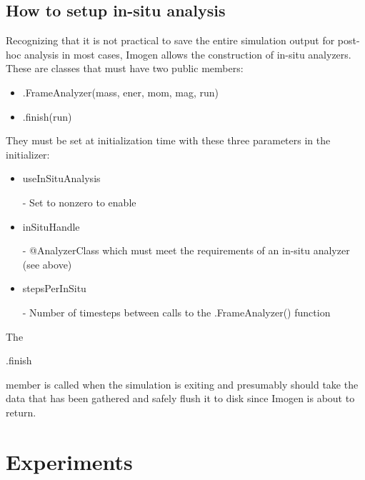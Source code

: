 \documentclass[letterpaper,12pt,twocolumn]{article}
\begin{document}
\subsection{How to setup in-situ analysis}

Recognizing that it is not practical to save the entire simulation output for post-hoc analysis in
most cases, Imogen allows the construction of in-situ analyzers. These are classes that must have
two public members:
\begin{itemize}
\item \begin{tt}.FrameAnalyzer(mass, ener, mom, mag, run)\end{tt}
\item \begin{tt}.finish(run)\end{tt}
\end{itemize}

They must be set at initialization time with these three parameters in the initializer:
\begin{itemize}
\item \begin{tt}useInSituAnalysis\end{tt} - Set to nonzero to enable
\item \begin{tt}inSituHandle\end{tt} - @AnalyzerClass which must meet the requirements of an
in-situ analyzer (see above)
\item \begin{tt}stepsPerInSitu\end{tt} - Number of timesteps between calls to the .FrameAnalyzer() function
\end{itemize}

The \begin{tt}.finish\end{tt} member is called when the simulation is exiting and presumably should
take the data that has been gathered and safely flush it to disk since Imogen is about to return.

\section{Experiments}






\end{document}
